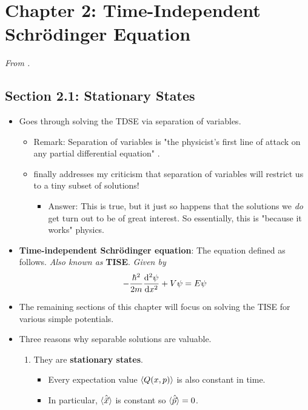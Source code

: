 \documentclass[../notes.tex]{subfiles}
\begin{document}
\section{Chapter 2: Time-Independent Schr\"{o}dinger Equation}
\emph{From \textcite{bib:Griffiths}.}
\subsection*{Section 2.1: Stationary States}
\begin{itemize}
    \item Goes through solving the TDSE via separation of variables.
    \begin{itemize}
        \item Remark: Separation of variables is "the physicist's first line of attack on any partial differential equation" \parencite[43]{bib:Griffiths}.
        \item \textcite{bib:Griffiths} finally addresses my criticism that separation of variables will restrict us to a tiny subset of solutions!
        \begin{itemize}
            \item Answer: This is true, but it just so happens that the solutions we \emph{do} get turn out to be of great interest. So essentially, this is "because it works" physics.
        \end{itemize}
    \end{itemize}
    \item \textbf{Time-independent Schr\"{o}dinger equation}: The equation defined as follows. \emph{Also known as} \textbf{TISE}. \emph{Given by}
    \begin{equation*}
        -\frac{\hbar^2}{2m}\dv[2]{\psi}{x}+V\psi = E\psi
    \end{equation*}
    \item The remaining sections of this chapter will focus on solving the TISE for various simple potentials.
    \item Three reasons why separable solutions are valuable.
    \begin{enumerate}
        \item They are \textbf{stationary states}.
        \begin{itemize}
            \item Every expectation value $\langle{Q(x,p)}\rangle$ is also constant in time.
            \item In particular, $\langle{\hat{\vec{x}}}\rangle$ is constant so $\langle{\hat{\vec{p}}}\rangle=0$.
        \end{itemize}

\end{enumerate}
\end{itemize}
\end{document}
